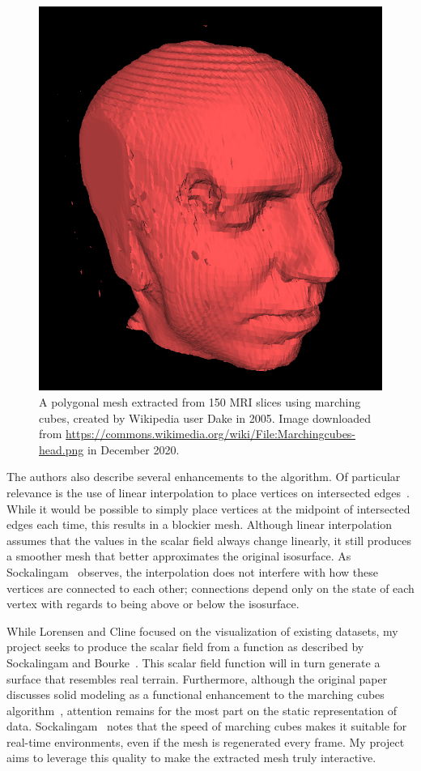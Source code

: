 \documentclass[pageno]{jpaper}
\begin{document}
\begin{figure}[hbt]
\centering
\includegraphics[width=0.50\linewidth]{Marchingcubes-head.png}
\caption{A polygonal mesh extracted from 150 MRI slices using marching cubes, created by Wikipedia user Dake in 2005. Image downloaded from \url{https://commons.wikimedia.org/wiki/File:Marchingcubes-head.png} in December 2020.}
\label{fig:mri}
\end{figure}

The authors also describe several enhancements to the algorithm. Of particular relevance is the use of linear interpolation to place vertices on intersected edges~\cite{lorensen}. While it would be possible to simply place vertices at the midpoint of intersected edges each time, this results in a blockier mesh. Although linear interpolation assumes that the values in the scalar field always change linearly, it still produces a smoother mesh that better approximates the original isosurface. As Sockalingam~\cite{kieran} observes, the interpolation does not interfere with how these vertices are connected to each other; connections depend only on the state of each vertex with regards to being above or below the isosurface.

While Lorensen and Cline focused on the visualization of existing datasets, my project seeks to produce the scalar field from a function as described by Sockalingam and Bourke~\cite{kieran,bourke}. This scalar field function will in turn generate a surface that resembles real terrain. Furthermore, although the original paper discusses solid modeling as a functional enhancement to the marching cubes algorithm~\cite{lorensen}, attention remains for the most part on the static representation of data. Sockalingam~\cite{kieran} notes that the speed of marching cubes makes it suitable for real-time environments, even if the mesh is regenerated every frame. My project aims to leverage this quality to make the extracted mesh truly interactive.
\end{document}
